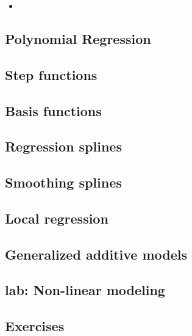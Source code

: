 \begin{itemize}
	\item
 \end{itemize}
\subsection{Polynomial Regression}

\subsection{Step functions}

\subsection{Basis functions}

\subsection{Regression splines}

\subsection{Smoothing splines}

\subsection{Local regression}

\subsection{Generalized additive models}

\subsection{lab: Non-linear modeling}

\subsection{Exercises}

